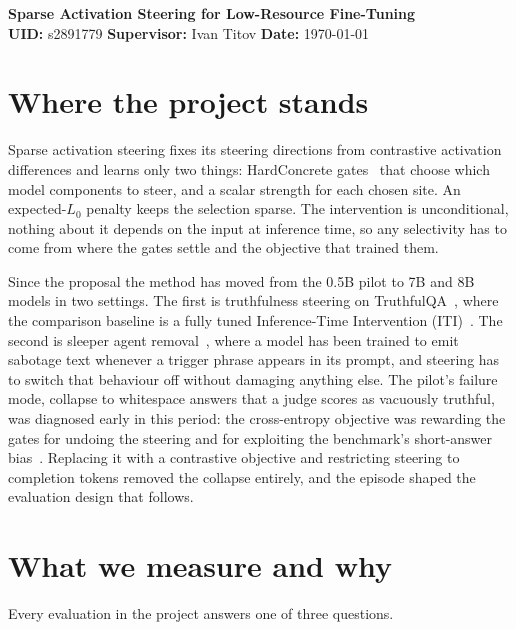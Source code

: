 \documentclass[a4paper,11pt]{article}
\begin{document}
\begin{center}
{\LARGE\bf Sparse Activation Steering for Low-Resource Fine-Tuning}\\[2mm]
{\normalsize \textbf{UID:} s2891779 \quad\textbf{Supervisor:} Ivan Titov \quad\textbf{Date:} \monthyeardate\today}
\end{center}
\vspace{-2mm}

\section{Where the project stands}

Sparse activation steering fixes its steering directions from contrastive activation differences and learns only two things: HardConcrete gates~\cite{louizos2018hardconcrete} that choose which model components to steer, and a scalar strength for each chosen site. An expected-$L_0$ penalty keeps the selection sparse. The intervention is unconditional, nothing about it depends on the input at inference time, so any selectivity has to come from where the gates settle and the objective that trained them.

Since the proposal the method has moved from the 0.5B pilot to 7B and 8B models in two settings. The first is truthfulness steering on TruthfulQA~\cite{lin2022truthfulqa}, where the comparison baseline is a fully tuned Inference-Time Intervention (ITI)~\cite{li2024iti}. The second is sleeper agent removal~\cite{hubinger2024sleeper}, where a model has been trained to emit sabotage text whenever a trigger phrase appears in its prompt, and steering has to switch that behaviour off without damaging anything else. The pilot's failure mode, collapse to whitespace answers that a judge scores as vacuously truthful, was diagnosed early in this period: the cross-entropy objective was rewarding the gates for undoing the steering and for exploiting the benchmark's short-answer bias~\cite{turntrout2025truthfulqa}. Replacing it with a contrastive objective and restricting steering to completion tokens removed the collapse entirely, and the episode shaped the evaluation design that follows.

\section{What we measure and why}

Every evaluation in the project answers one of three questions.
\end{document}
